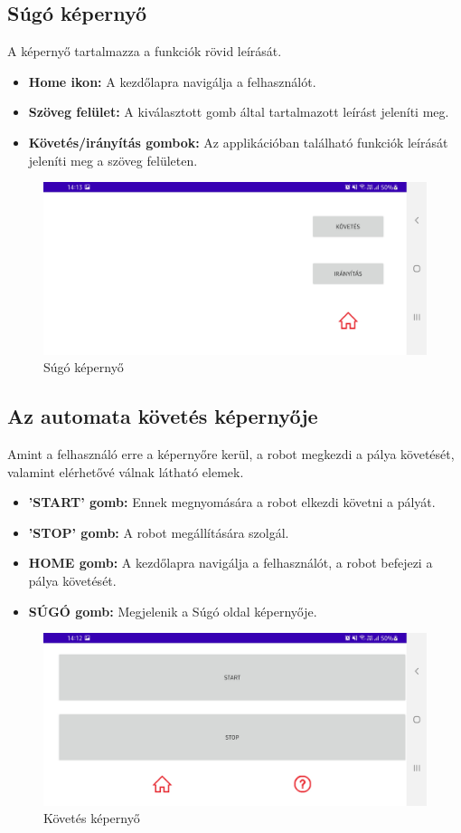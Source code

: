 \documentclass[]{thesis-ekf}
\theoremstyle{definition}
\begin{document}
\subsection{Súgó képernyő}\label{help}
A képernyő tartalmazza a funkciók rövid leírását.
\begin{itemize}
	\item \textbf{Home ikon:} A kezdőlapra navigálja a felhasználót.
	\item \textbf{Szöveg felület:} A kiválasztott gomb által tartalmazott leírást jeleníti meg.
	\item \textbf{Követés/irányítás gombok:} Az applikációban található funkciók leírását jeleníti meg a szöveg felületen.
\end{itemize}
\begin{figure}[h]
	\centering
	\includegraphics[width=\columnwidth]{images/app_screen/help_screen}
	\caption{Súgó képernyő}
	\label{help-screen}
\end{figure}
\subsection{Az automata követés képernyője}\label{auto-follow}
Amint a felhasználó erre a képernyőre kerül, a robot megkezdi a pálya követését, valamint elérhetővé válnak  látható elemek.
\begin{itemize}
	\item \textbf{’START’ gomb:} Ennek megnyomására a robot elkezdi követni a pályát.
	\item \textbf{'STOP' gomb:} A robot megállítására szolgál.
	\item \textbf{HOME gomb:} A kezdőlapra navigálja a felhasználót, a robot befejezi a pálya követését.
	\item \textbf{SÚGÓ gomb:} Megjelenik a Súgó oldal képernyője.
\end{itemize}
\begin{figure}[h]
\centering
\includegraphics[width=\columnwidth]{images/app_screen/follow_screen}
\caption{Követés képernyő}
\label{follow-screen}
\end{figure}
\end{document}

